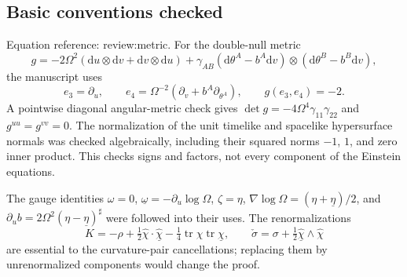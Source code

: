 \documentclass[10pt]{article}
\begin{document}
\subsection*{Basic conventions checked}
Equation reference: review:metric. For the double-null metric \[
 g=-2\Omega^2(\mathrm du\otimes\mathrm dv+\mathrm dv\otimes\mathrm du)
 +\gamma_{AB}(\mathrm d\theta^A-b^A\mathrm dv)
                \otimes(\mathrm d\theta^B-b^B\mathrm dv),\] the manuscript uses \[e_3=\partial_u,\qquad
 e_4=\Omega^{-2}(\partial_v+b^A\partial_{\theta^A}),\qquad
 g(e_3,e_4)=-2.\] A pointwise diagonal angular-metric check gives \(\det g=-4\Omega^4\gamma_{11}\gamma_{22}\) and \(g^{uu}=g^{vv}=0\). The normalization of the unit timelike and spacelike hypersurface normals was checked algebraically, including their squared norms \(-1\), \(1\), and zero inner product. This checks signs and factors, not every component of the Einstein equations.\par
The gauge identities \(\omega=0\), \(\underline\omega=-\partial_u\log\Omega\), \(\zeta=\eta\), \(\nabla\log\Omega=(\eta+\underline\eta)/2\), and \(\partial_u b=2\Omega^2(\eta-\underline\eta)^\sharp\) were followed into their uses. The renormalizations \[K=-\rho+\tfrac12\widehat\chi\mathbin{\cdot}\widehat{\underline\chi}
                  -\tfrac14\operatorname{tr}\chi\operatorname{tr}\underline\chi,
 \qquad
 \check\sigma=\sigma+\tfrac12\widehat{\underline\chi}\wedge\widehat\chi\] are essential to the curvature-pair cancellations; replacing them by unrenormalized components would change the proof.\par
\end{document}
